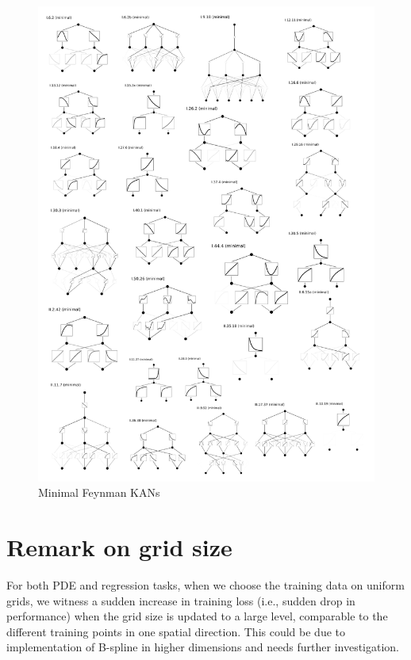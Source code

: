 \documentclass{article}
\numberwithin{equation}{section}
\numberwithin{figure}{section}
\begin{document}
\begin{figure}[t]
    \centering
    \includegraphics[width=1\linewidth]{figs/minimal_feynman_kan.pdf}
    \caption{Minimal Feynman KANs}
    \label{fig:minimal-feynman-kan}
\end{figure}



\section{Remark on grid size}
For both PDE and regression tasks, when we choose the training data on uniform grids, we witness a sudden increase in training loss (i.e., sudden drop in performance) when the grid size is updated to a large level, comparable to the different training points in one spatial direction. This could be due to implementation of B-spline in higher dimensions and needs further investigation.
\end{document}
